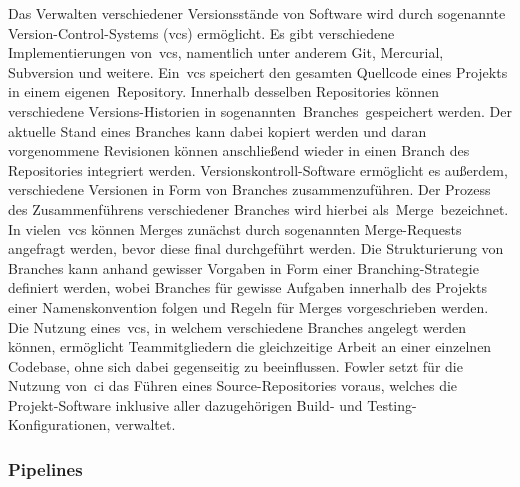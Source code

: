 Das Verwalten verschiedener Versionsstände von Software wird durch sogenannte Version-Control-Systems (\acrshort{vcs})
ermöglicht.
Es gibt verschiedene Implementierungen von\ \acrshort{vcs}, namentlich unter anderem Git, Mercurial, Subversion und
weitere.
Ein\ \acrshort{vcs} speichert den gesamten Quellcode eines Projekts in einem eigenen\ \glqq Repository\grqq.
Innerhalb desselben Repositories können verschiedene Versions-Historien in sogenannten\ \glqq Branches\grqq\ gespeichert
werden.
Der aktuelle Stand eines Branches kann dabei kopiert werden und daran vorgenommene Revisionen können anschließend wieder
in einen Branch des Repositories integriert werden.
Versionskontroll-Software ermöglicht es außerdem, verschiedene Versionen in Form von Branches zusammenzuführen.
Der Prozess des Zusammenführens verschiedener Branches wird hierbei als\ \glqq Merge\grqq\ bezeichnet.
In vielen\ \acrshort{vcs} können Merges zunächst durch sogenannten Merge-Requests angefragt werden, bevor diese
final durchgeführt werden.
Die Strukturierung von Branches kann anhand gewisser Vorgaben in Form einer Branching-Strategie definiert werden, wobei
Branches für gewisse Aufgaben innerhalb des Projekts einer Namenskonvention folgen und Regeln für Merges
vorgeschrieben werden.
Die Nutzung eines\ \acrshort{vcs}, in welchem verschiedene Branches angelegt werden können, ermöglicht Teammitgliedern
die gleichzeitige Arbeit an einer einzelnen Codebase, ohne sich dabei gegenseitig zu beeinflussen.
Fowler setzt für die Nutzung von\ \acrshort{ci} das Führen eines Source-Repositories voraus, welches die
Projekt-Software inklusive aller dazugehörigen Build- und Testing-Konfigurationen, verwaltet.

\subsubsection{Pipelines}


